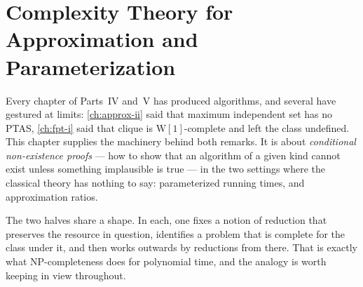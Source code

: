 
\chapter[Complexity for Approximation and FPT]{Complexity Theory for Approximation and Parameterization}
\label{ch:hardness}

Every chapter of Parts~IV and~V has produced algorithms, and several have
gestured at limits: \cref{ch:approx-ii} said that maximum independent set has no
PTAS, \cref{ch:fpt-i} said that clique is $\mathrm{W}[1]$-complete and left the
class undefined. This chapter supplies the machinery behind both remarks. It is
about \emph{conditional non-existence proofs} --- how to show that an algorithm
of a given kind cannot exist unless something implausible is true --- in the two
settings where the classical theory has nothing to say: parameterized running
times, and approximation ratios.

The two halves share a shape. In each, one fixes a notion of reduction that
preserves the resource in question, identifies a problem that is complete for
the class under it, and then works outwards by reductions from there. That is
exactly what \textrm{NP}-completeness does for polynomial time, and the analogy
is worth keeping in view throughout.

